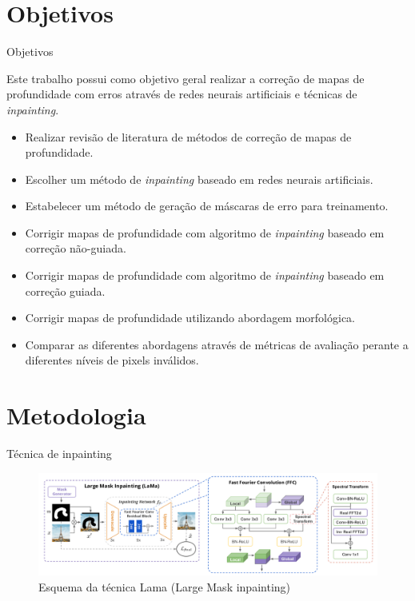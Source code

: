 \documentclass[aspectratio=169]{beamer}
\begin{document}
\section{Objetivos}

\begin{frame}{Objetivos}

Este trabalho possui como objetivo geral realizar a correção de mapas de profundidade com erros através de redes neurais artificiais e técnicas de \textit{inpainting}.

\begin{itemize}
    \item Realizar revisão de literatura de métodos de correção de mapas de profundidade.
    \item Escolher um método de \textit{inpainting} baseado em redes neurais artificiais.
    \item Estabelecer um método de geração de máscaras de erro para treinamento.
    \item Corrigir mapas de profundidade com algoritmo de \textit{inpainting} baseado em correção não-guiada.
    \item Corrigir mapas de profundidade com algoritmo de \textit{inpainting} baseado em correção guiada.
    \item Corrigir mapas de profundidade utilizando abordagem morfológica.
    \item Comparar as diferentes abordagens através de métricas de avaliação perante a diferentes níveis de pixels inválidos.
    
\end{itemize}

\end{frame}
\section{Metodologia}


\begin{frame}{Técnica de inpainting}
\begin{figure}
    \centering
    \includegraphics[width=\textwidth]{figs/lama.png}
    \caption{Esquema da técnica Lama (Large Mask inpainting)}
\end{figure}
    
\end{frame}
\end{document}
